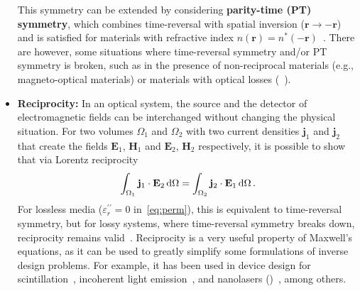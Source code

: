 \begin{itemize}
              This
              symmetry can be extended by
              considering \textbf{parity-time (PT) symmetry}, which combines time-reversal
              with spatial inversion ($\mathbf{r}\to-\mathbf{r}$) and is satisfied for
              materials with refractive index $n(\mathbf{r}) = n^*(-\mathbf{r})$~\cite{pt}. There
              are however, some situations where time-reversal symmetry and/or PT symmetry is
              broken,
              such as in the presence of
              non-reciprocal materials (e.g., magneto-optical materials) or materials with
              optical losses (~\cite{ownpub0}).

              \item \textbf{Reciprocity:} In an optical system, the source and the
              detector of electromagnetic fields can be interchanged without changing the
              physical situation. For two volumes $\Omega_1$ and
                           $\Omega_2$
              with two current densities $\mathbf{j}_1$ and $\mathbf{j}_2$ that create
              the fields $\mathbf{E}_1$, $\mathbf{H}_1$ and $\mathbf{E}_2$, $\mathbf{H}_2$
              respectively, it is possible to show that via Lorentz reciprocity~\cite{novotny}
                           \begin{equation}\label{eq:reciprocity}
                               \int_{\Omega_1} \mathbf{j}_1 \cdot  \mathbf{E}_2 \mathop{}\!\text{d} \Omega = \int_{\Omega_2}
                               \mathbf{j}_2 \cdot  \mathbf{E}_1 \mathop{}\!\text{d} \Omega\,.
                           \end{equation}
              For lossless media ($\varepsilon_r^{\prime\prime} = 0$ in~\eqref{eq:perm}), this is equivalent to time-reversal symmetry, but for
              lossy systems, where time-reversal symmetry breaks down, reciprocity remains valid~\cite{Carminati:98}. Reciprocity
              is a very useful property of Maxwell's equations, as it can be used to
              greatly simplify some formulations of inverse design problems. For example, it has been used in device design for
              scintillation~\cite{Roques_Carmes_2022}, incoherent light emission~\cite{LED_opt, Yao_2022}, and nanolasers ()~\cite{ownpub4}, among others.
    \end{itemize}



